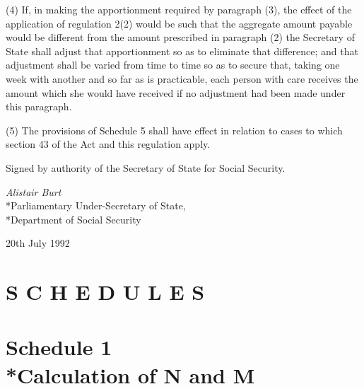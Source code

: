 \documentclass[12pt,a4paper]{article}
\begin{document}
(4) If, in making the apportionment required by paragraph (3), the effect of the application of regulation 2(2) would be such that the aggregate amount payable would be different from the amount prescribed in paragraph (2) the Secretary of State shall adjust that apportionment so as to eliminate that difference; and that adjustment shall be varied from time to time so as to secure that, taking one week with another and so far as is practicable, each person with care receives the amount which she would have received if no adjustment had been made under this paragraph.

(5) The provisions of Schedule 5 shall have effect in relation to cases to which section 43 of the Act and this regulation apply.


\bigskip

Signed by authority of the Secretary of State for Social Security.

{\raggedleft
\emph{Alistair Burt}\\*Parliamentary Under-Secretary of State,\\*Department of Social Security

}

20th July 1992

\clearpage

\small

\part*{S C H E D U L E S}

\part[Schedule 1 --- Calculation of N and M]{Schedule 1\\*Calculation of N and M}
\end{document}
